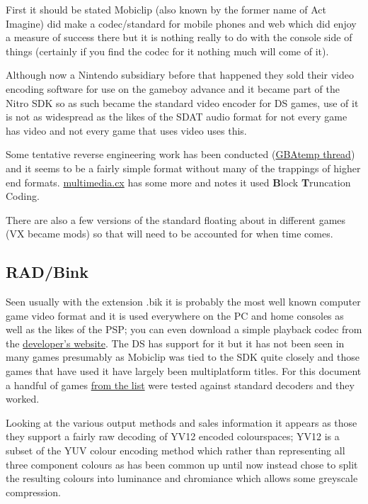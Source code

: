 \documentclass[
]{book}
\begin{document}
First it should be stated Mobiclip (also known by the former name of Act Imagine) did make a codec/standard for mobile phones and web which did enjoy a measure of success there but it is nothing really to do with the console side of things (certainly if you find the codec for it nothing much will come of it).

Although now a Nintendo subsidiary before that happened they sold their video encoding software for use on the gameboy advance and it became part of the Nitro SDK so as such became the standard video encoder for DS games, use of it is not as widespread as the likes of the SDAT audio format for not every game has video and not every game that uses video uses this.

Some tentative reverse engineering work has been conducted (\href{http://gbatemp.net/topic/125374-player-of-vx-file/page__view__findpost__p__3830983}{GBAtemp thread}) and it seems to be a fairly simple format without many of the trappings of higher end formats. \href{http://wiki.multimedia.cx/index.php?title=Mobiclip_Video_Codec}{multimedia.cx} has some more and notes it used \textbf{B}lock \textbf{T}runcation Coding.

There are also a few versions of the standard floating about in different games (VX became mods) so that will need to be accounted for when time comes.

\hypertarget{radbink}{%
\subsection{RAD/Bink}\label{radbink}}

Seen usually with the extension .bik it is probably the most well known computer game video format and it is used everywhere on the PC and home consoles as well as the likes of the PSP; you can even download a simple playback codec from the \href{http://www.radgametools.com/bnkdown.htm}{developer's website}. The DS has support for it but it has not been seen in many games presumably as Mobiclip was tied to the SDK quite closely and those games that have used it have largely been multiplatform titles. For this document a handful of games \href{http://www.radgametools.com/binkgames.htm\#games}{from the list} were tested against standard decoders and they worked.

Looking at the various output methods and sales information it appears as those they support a fairly raw decoding of YV12 encoded colourspaces; YV12 is a subset of the YUV colour encoding method which rather than representing all three component colours as has been common up until now instead chose to split the resulting colours into luminance and chromiance which allows some greyscale compression.
\end{document}
